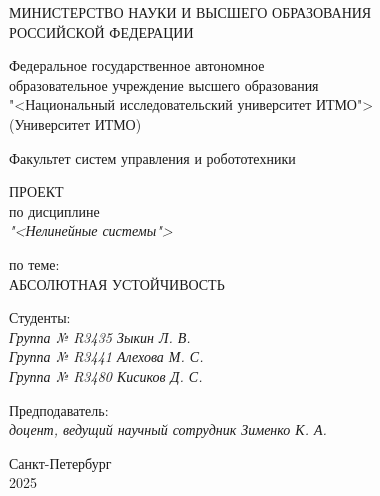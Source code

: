 \thispagestyle{empty}

\begin{center}
    МИНИСТЕРСТВО НАУКИ И ВЫСШЕГО ОБРАЗОВАНИЯ \\ РОССИЙСКОЙ ФЕДЕРАЦИИ

    \vspace{20pt}

    Федеральное государственное автономное \\ образовательное учреждение высшего образования \\
    "<Национальный исследовательский университет ИТМО"> \\
    (Университет ИТМО)

    \vspace{20pt}

    Факультет систем управления и робототехники
\end{center}

\vfill

\begin{center}
    ПРОЕКТ \\  
    по дисциплине \\
    \textit{"<Нелинейные системы">}

    \vspace{20pt}

    по теме: \\
    \uppercase{Абсолютная устойчивость}
\end{center}

\vfill

    \noindent Студенты: \\
    \textit{Группа № R3435 \hfill Зыкин Л. В.} \\
    \textit{Группа № R3441 \hfill Алехова М. С.} \\
    \textit{Группа № R3480 \hfill Кисиков Д. С.} \\

    \vspace{20pt}

    \noindent Предподаватель: \\
    \textit{доцент, ведущий научный сотрудник \hfill Зименко К. А.}

\vfill

\begin{center}
    Санкт-Петербург \\ 2025
\end{center}